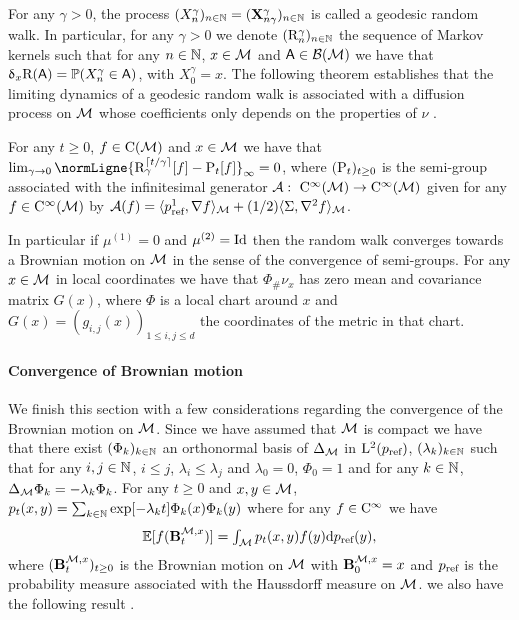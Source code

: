     For any $\gamma > 0$, the process
    $(X_n^\gamma)_{n \in \mathbb{N}} = (\mathbf{X}_{n \gamma}^\gamma)_{n \in \mathbb{N}}$ is
    called a geodesic random walk. In particular, for any $\gamma>0$ we denote
    $(\mathrm{R}_n^{\gamma})_{n \in \mathbb{N}}$ the sequence of Markov kernels such that
    for any $n \in \mathbb{N}$, $x \in \mathcal M$ and $\mathsf{A} \in \mathcal{B}(\mathcal M)$ we have that
    $\updelta_x \mathrm{R}(\mathsf{A}) = \mathbb{P}(X_n^\gamma \in \mathsf{A})$, with $X_0^\gamma =
    x$. The following theorem establishes that the limiting dynamics of a
    geodesic random walk is associated with a diffusion process on $\mathcal M$ whose
    coefficients only depends on the properties of $\nu$ \cite[see][Theorem
    2.1]{jorgensen1975central}.

    \begin{theorem}
      \label{thm:jorgensen_appendix}
      For any $t \geq 0$, $f \in \mathrm{C}(\mathcal M)$ and $x \in \mathcal M$ we have that
      $\lim_{\gamma \to 0} \normLigne{ \Rker_{\gamma}^{\ceil{t/\gamma}}[f] -
        \Pker_t[f]}_{\infty} = 0$, where $(\mathrm{P}_t)_{t \geq 0}$ is the
      semi-group associated with the infinitesimal generator
      $\mathcal{A}: \ \mathrm{C}^\infty(\mathcal M) \to \mathrm{C}^\infty(\mathcal M)$ given for any
      $f \in \mathrm{C}^\infty(\mathcal M)$ by
      $\mathcal{A}(f) = \langle p_{\textup{ref}}^1, \nabla f \rangle_{\mathcal M} + (1/2) \langle
      \Sigma, \nabla^2f \rangle_{\mathcal M}$.
    \end{theorem}   

    In particular if $\mu^{(1)} = 0$ and $\mu^{(2)} = \operatorname{Id}$ then the random walk
    converges towards a Brownian motion on $\mathcal M$ in the sense of the convergence
    of semi-groups. For any $x \in \mathcal M$ in local coordinates we have that
    $\Phi_\# \nu_x$ has zero mean and covariance matrix $G(x)$, where $\Phi$ is
    a local chart around $x$ and $G(x) = (g_{i,j}(x))_{1 \leq i,j \leq d}$ the
    coordinates of the metric in that chart.

    
\paragraph{Convergence of Brownian motion}

We finish this section with a few considerations regarding the convergence of
the Brownian motion on $\mathcal M$. Since we have assumed that $\mathcal M$ is compact we have
that there exist $(\Phi_k)_{k \in \mathbb{N}}$ an orthonormal basis of $\Delta_\mathcal M$ in
$\mathrm{L}^2(p_{\textup{ref}})$, $(\lambda_k)_{k \in \mathbb{N}}$ such that for any
$i, j \in \mathbb{N}$, $i \leq j$, $\lambda_i \leq \lambda_j$ and $\lambda_0 = 0$, $\Phi_0=1$ and
for any $k \in \mathbb{N}$, $\Delta_\mathcal M \Phi_k = -\lambda_k \Phi_k$. For any $t \geq 0$
and $x,y \in \mathcal M$,
$p_t(x,y) = \sum_{k \in \mathbb{N}} \exp[-\lambda_k t] \Phi_k(x) \Phi_k(y)$ where for
any $f \in \mathrm{C}^\infty$ we have
\begin{equation}
  \textstyle{\mathbb{E}[ f(\mathbf{B}_t^{\mathcal M,x}) ] = \int_\mathcal Mp_t(x,y) f(y) \mathrm{d}p_{\textup{ref}}(y)  , }
\end{equation}
where $(\mathbf{B}_t^{\mathcal M,x})_{t \geq 0}$ is the Brownian motion on $\mathcal M$ with $\mathbf{B}_0^{\mathcal M,x} = x$
and $p_{\textup{ref}}$ is the probability measure associated with the Haussdorff measure on
$\mathcal M$. we also have the following result \cite[see][Proposition
2.6]{urakawa2006convergence}.

